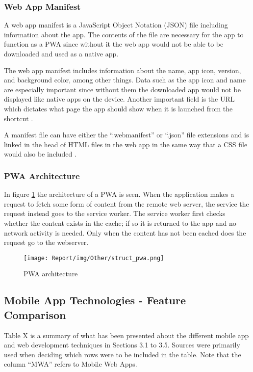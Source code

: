 \documentclass[a4paper,12pt]{article}
\begin{document}
\subsubsection{Web App Manifest}
A web app manifest is a JavaScript Object Notation (JSON) file including information about the app. The contents of the file are necessary for the app to function as a PWA since without it the web app would not be able to be downloaded and used as a native app. 

The web app manifest includes information about the name, app icon, version, and background color, among other things. Data such as the app icon and name are especially important since without them the downloaded app would not be displayed like native apps on the device. Another important field is the URL which dictates what page the app should show when it is launched from the shortcut \cite{mozilla_webmanifest}. 

A manifest file can have either the “.webmanifest” or “.json” file extensions and is linked in the head of HTML files in the web app in the same way that a CSS file would also be included \cite{mozilla_webmanifest}.

\subsubsection{PWA Architecture}
In figure \ref{fig:pwaapp} the architecture of a PWA is seen. When the application makes a request to fetch some form of content from the remote web server, the service the request instead goes to the service worker. The service worker first checks whether the content exists in the cache; if so it is returned to the app and no network activity is needed. Only when the content has not been cached does the request go to the webserver. 
\begin{figure}[h]%
	\centering
	\texttt{[image: Report/img/Other/struct\_pwa.png]}
	\caption{PWA architecture}%
	\label{fig:pwaapp}%
\end{figure}



\subsection{Mobile App Technologies - Feature Comparison}
Table X is a summary of what has been presented about the different mobile app and web development techniques in Sections 3.1 to 3.5. Sources \cite{mobile_web_apps_2013, dawning_of_pwa, pwa_in_modern_webdeb} were primarily used when deciding which rows were to be included in the table. Note that the column “MWA” refers to Mobile Web Apps. 
\end{document}
